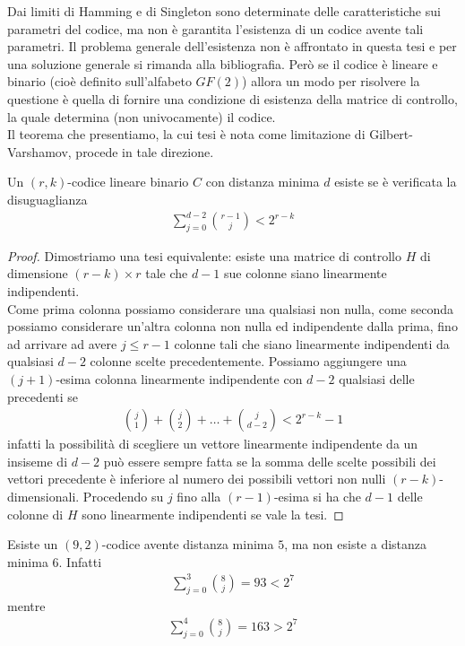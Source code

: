 Dai limiti di Hamming e di Singleton sono determinate delle caratteristiche sui parametri del codice, ma non è garantita l'esistenza di un codice avente tali parametri. Il problema generale dell'esistenza non è affrontato in questa tesi e per una soluzione generale si rimanda alla bibliografia. Però se il codice è lineare e binario (cioè definito sull'alfabeto $GF(2)$) allora un modo per risolvere la questione è quella di fornire una condizione di esistenza della matrice di controllo, la quale determina (non univocamente) il codice. \\
Il teorema che presentiamo, la cui tesi è nota come limitazione di Gilbert-Varshamov, procede in tale direzione.
\begin{teorema}
   Un $(r,k)$-codice lineare binario $C$ con distanza minima $d$ esiste se è verificata la disuguaglianza
   \begin{align*}
      \sum_{j=0}^{d-2} \binom{r-1}{j} < 2^{r-k}
   \end{align*}
\end{teorema}
\begin{proof}
   Dimostriamo una tesi equivalente: esiste una matrice di controllo $H$ di dimensione $(r-k)\times r$ tale che $d-1$ sue colonne siano linearmente indipendenti.\\
   Come prima colonna possiamo considerare una qualsiasi non nulla, come seconda possiamo considerare un'altra colonna non nulla ed indipendente dalla prima, fino ad arrivare ad avere $j \leq r-1$ colonne tali che siano linearmente indipendenti da qualsiasi $d-2$ colonne scelte precedentemente. 
   Possiamo aggiungere una $(j+1)$-esima colonna linearmente indipendente con $d-2$ qualsiasi delle precedenti se 
   \begin{align*}
      \binom{j}{1} + \binom{j}{2}+ \dots + \binom{j}{d-2}
      <
      2^{r-k} - 1
   \end{align*}
   infatti la possibilità di scegliere un vettore linearmente indipendente da un insiseme di $d-2$ può essere sempre fatta se la somma delle scelte possibili dei vettori precedente è inferiore al numero dei possibili vettori non nulli $(r-k)$-dimensionali.
   Procedendo su $j$ fino alla $(r-1)$-esima si ha che $d-1$ delle colonne di $H$ sono linearmente indipendenti se vale la tesi.
\end{proof}
\begin{esempio}
   Esiste un $(9,2)$-codice avente distanza minima $5$, ma non esiste a distanza minima $6$. Infatti
   \begin{align*}
      \sum_{j=0}^{3} \binom{8}{j} = 93 < 2^{7}
   \end{align*}
   mentre
   \begin{align*}
      \sum_{j=0}^{4} \binom{8}{j} = 163 > 2^{7}
   \end{align*}
\end{esempio}

